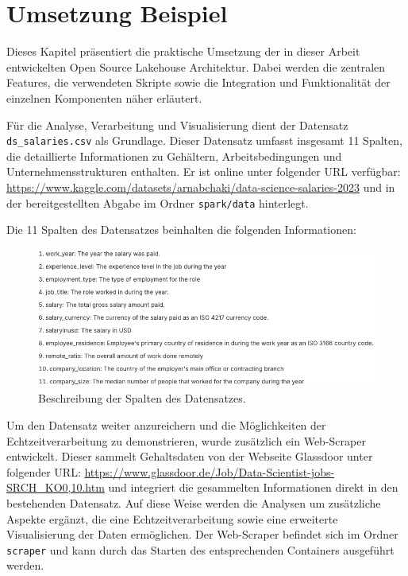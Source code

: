 \chapter{Umsetzung Beispiel}\label{chapter:Beispiel}

Dieses Kapitel präsentiert die praktische Umsetzung der in dieser Arbeit entwickelten Open Source Lakehouse Architektur. Dabei werden die zentralen Features, die verwendeten Skripte sowie die Integration und Funktionalität der einzelnen Komponenten näher erläutert.

Für die Analyse, Verarbeitung und Visualisierung dient der Datensatz \texttt{ds\_salaries.csv} als Grundlage. Dieser Datensatz umfasst insgesamt 11 Spalten, die detaillierte Informationen zu Gehältern, Arbeitsbedingungen und Unternehmensstrukturen enthalten. Er ist online unter folgender URL verfügbar: \url{https://www.kaggle.com/datasets/arnabchaki/data-science-salaries-2023} und in der bereitgestellten Abgabe im Ordner \texttt{spark/data} hinterlegt.

Die 11 Spalten des Datensatzes beinhalten die folgenden Informationen:
\begin{figure}[H]
    \centering
    \includegraphics[width=1\linewidth]{graphics/datensatz.png}
    \caption[Beschreibung der Spalten des Datensatzes]{Beschreibung der Spalten des Datensatzes.}
    \label{fig:Datensatz-Kaggle}
\end{figure}

Um den Datensatz weiter anzureichern und die Möglichkeiten der Echtzeitverarbeitung zu demonstrieren, wurde zusätzlich ein Web-Scraper entwickelt. Dieser sammelt Gehaltsdaten von der Webseite Glassdoor unter folgender URL: \url{https://www.glassdoor.de/Job/Data-Scientist-jobs-SRCH_KO0,10.htm} und integriert die gesammelten Informationen direkt in den bestehenden Datensatz. Auf diese Weise werden die Analysen um zusätzliche Aspekte ergänzt, die eine Echtzeitverarbeitung sowie eine erweiterte Visualisierung der Daten ermöglichen. Der Web-Scraper befindet sich im Ordner \lstinline|scraper| und kann durch das Starten des entsprechenden Containers ausgeführt werden.

